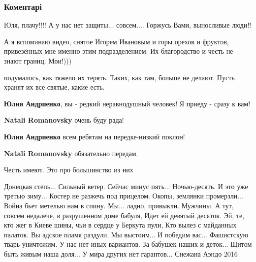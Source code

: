 
 
 
 
 
\subsubsection{Коментарі}
\label{sec:24_11_2021.fb.andrienko_julia.doneck.1.front.cmt}

\begin{itemize} %
Юля, плачу!!!! А у нас нет защиты... совсем.... Горжусь Вами, выносливые люди!!


А я вспоминаю видео, снятое Игорем Ивановым и горы орехов и фруктов,
привезённых мне именно этим подразделением. Их благородство и честь не знают
границ. Мои!)))

\begin{itemize} %
подумалось, как тяжело их терять. Таких, как там, больше не делают. Пусть хранят их все святые, какие есть.
\end{itemize} %

\textbf{Юлия Андриенко}, вы - редкий неравнодушный человек! Я приеду - сразу к вам!

\begin{itemize} %
\textbf{Natali Romanovsky} очень буду рада!

\textbf{Юлия Андриенко} всем ребятам на передке-низкий поклон!

\textbf{Natali Romanovsky} обязательно передам.
\end{itemize} %

Честь имеют. Это про большинство из них


\obeycr
Донецкая степь... Сильный ветер. Сейчас минус пять... Ночью-десять.
И это уже третью зиму...
Костер не разжечь под прицелом. Окопы, землянки промерзли...
Война бьет метелью нам в спину.
Мы... ладно, привыкли. Мужчины. А тут, совсем недалече, в разрушенном доме бабуля,
Идет ей девятый десяток.
Эй, те, кто жег в Киеве шины, чьи в сердце у Беркута пули,
Кто вылез с майданных палаток.
Вы адское пламя раздули.
Мы выстоим... И победим вас... Фашистскую тварь уничтожим.
У нас нет иных вариантов.
За бабушек наших и деток... Щитом быть живым наша доля...
У мира других нет гарантов...
Снежана Аэндо
2016
\restorecr


\end{itemize}
